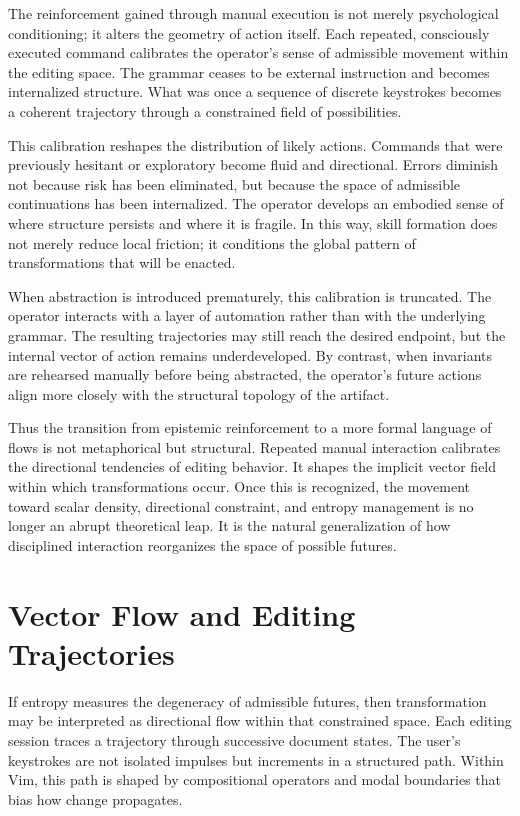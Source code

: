 \documentclass[12pt]{article}
\begin{document}
The reinforcement gained through manual execution is not merely psychological conditioning; it alters the geometry of action itself. Each repeated, consciously executed command calibrates the operator’s sense of admissible movement within the editing space. The grammar ceases to be external instruction and becomes internalized structure. What was once a sequence of discrete keystrokes becomes a coherent trajectory through a constrained field of possibilities.

This calibration reshapes the distribution of likely actions. Commands that were previously hesitant or exploratory become fluid and directional. Errors diminish not because risk has been eliminated, but because the space of admissible continuations has been internalized. The operator develops an embodied sense of where structure persists and where it is fragile. In this way, skill formation does not merely reduce local friction; it conditions the global pattern of transformations that will be enacted.

When abstraction is introduced prematurely, this calibration is truncated. The operator interacts with a layer of automation rather than with the underlying grammar. The resulting trajectories may still reach the desired endpoint, but the internal vector of action remains underdeveloped. By contrast, when invariants are rehearsed manually before being abstracted, the operator’s future actions align more closely with the structural topology of the artifact.

Thus the transition from epistemic reinforcement to a more formal language of flows is not metaphorical but structural. Repeated manual interaction calibrates the directional tendencies of editing behavior. It shapes the implicit vector field within which transformations occur. Once this is recognized, the movement toward scalar density, directional constraint, and entropy management is no longer an abrupt theoretical leap. It is the natural generalization of how disciplined interaction reorganizes the space of possible futures.

\section{Vector Flow and Editing Trajectories}

If entropy measures the degeneracy of admissible futures, then transformation may be interpreted as directional flow within that constrained space. Each editing session traces a trajectory through successive document states. The user’s keystrokes are not isolated impulses but increments in a structured path. Within Vim, this path is shaped by compositional operators and modal boundaries that bias how change propagates.
\end{document}
